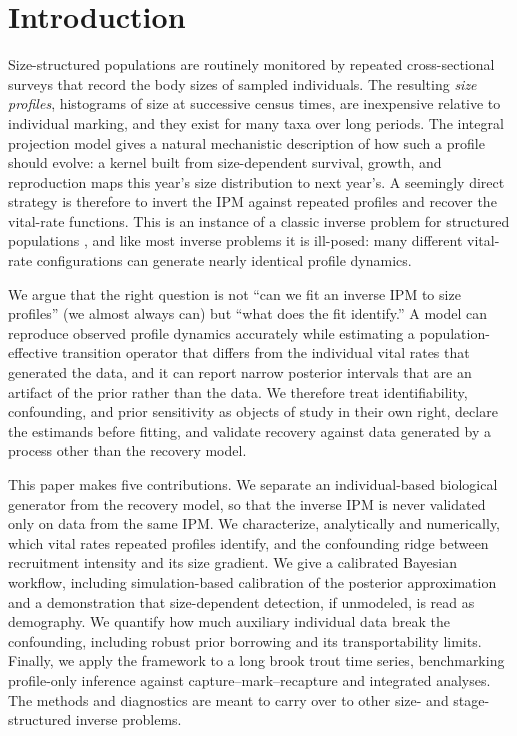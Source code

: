 \documentclass[11pt]{article}
\begin{document}
\section{Introduction}
\label{sec:intro}

Size-structured populations are routinely monitored by repeated cross-sectional
surveys that record the body sizes of sampled individuals. The resulting
\emph{size profiles}, histograms of size at successive census times, are
inexpensive relative to individual marking, and they exist for many taxa over
long periods. The integral projection model
\citep{easterling2000,ellner2006,merow2014} gives a natural mechanistic
description of how such a profile should evolve: a kernel built from
size-dependent survival, growth, and reproduction maps this year's size
distribution to next year's. A seemingly direct strategy is therefore to invert
the IPM against repeated profiles and recover the vital-rate functions. This is
an instance of a classic inverse problem for structured populations
\citep{wood1994,gross2002,ghosh2012}, and like most inverse problems it is
ill-posed: many different vital-rate configurations can generate nearly identical
profile dynamics.

We argue that the right question is not ``can we fit an inverse IPM to size
profiles'' (we almost always can) but ``what does the fit identify.'' A model can
reproduce observed profile dynamics accurately while estimating a
population-effective transition operator that differs from the individual vital
rates that generated the data, and it can report narrow posterior intervals that
are an artifact of the prior rather than the data. We therefore treat
identifiability, confounding, and prior sensitivity as objects of study in their
own right, declare the estimands before fitting, and validate recovery against
data generated by a process other than the recovery model.

This paper makes five contributions. We separate an individual-based biological
generator from the recovery model, so that the inverse IPM is never validated
only on data from the same IPM. We characterize, analytically and numerically,
which vital rates repeated profiles identify, and the confounding ridge between
recruitment intensity and its size gradient. We give a calibrated Bayesian
workflow, including simulation-based calibration of the posterior approximation
and a demonstration that size-dependent detection, if unmodeled, is read as
demography. We quantify how much auxiliary individual data break the confounding,
including robust prior borrowing and its transportability limits. Finally, we
apply the framework to a long brook trout time series, benchmarking profile-only
inference against capture--mark--recapture and integrated analyses. The methods
and diagnostics are meant to carry over to other size- and stage-structured
inverse problems.
\end{document}
